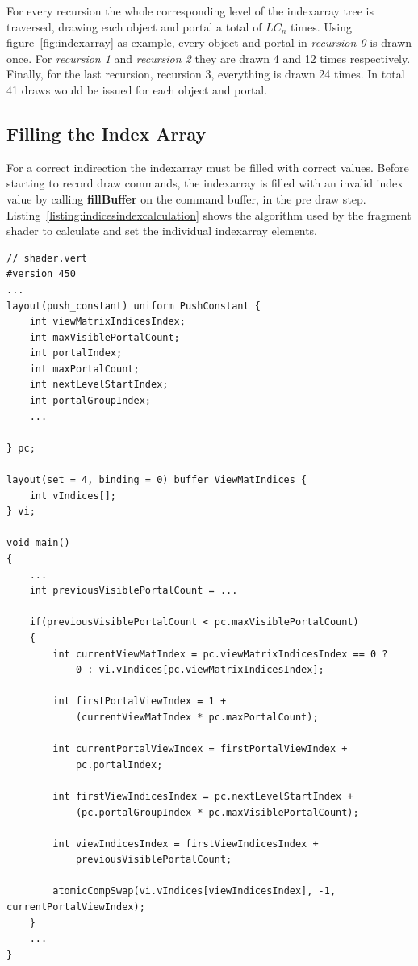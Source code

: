For every recursion the whole corresponding level of the \gls{indexarray} tree is traversed, drawing each object and portal a total of $LC_n$ times. Using figure~\ref{fig:indexarray} as example, every object and portal in \textit{recursion 0} is drawn once. For \textit{recursion 1} and \textit{recursion 2} they are drawn 4 and 12 times respectively. Finally, for the last recursion, recursion 3, everything is drawn 24 times. In total 41 draws would be issued for each object and portal.

\subsection{Filling the Index Array}
For a correct indirection the \gls{indexarray} must be filled with correct values. Before starting to record draw commands, the \gls{indexarray} is filled with an invalid index value by calling \textbf{fillBuffer} on the command buffer, in the pre draw step. Listing~\ref{listing:indicesindexcalculation} shows the algorithm used by the fragment shader to calculate and set the individual \gls{indexarray} elements.

\begin{lstlisting}[caption={Calculating Indices Index}, label=listing:indicesindexcalculation]
// shader.vert
#version 450
...
layout(push_constant) uniform PushConstant {	
	int viewMatrixIndicesIndex;
	int maxVisiblePortalCount;
	int portalIndex;
	int maxPortalCount;
	int nextLevelStartIndex;
	int portalGroupIndex;
	...

} pc;

layout(set = 4, binding = 0) buffer ViewMatIndices {
	int vIndices[];
} vi;

void main()
{
	...
	int previousVisiblePortalCount = ...
	
	if(previousVisiblePortalCount < pc.maxVisiblePortalCount)
	{
		int currentViewMatIndex = pc.viewMatrixIndicesIndex == 0 ? 
			0 : vi.vIndices[pc.viewMatrixIndicesIndex];
		
		int firstPortalViewIndex = 1 +
			(currentViewMatIndex * pc.maxPortalCount);
		
		int currentPortalViewIndex = firstPortalViewIndex +
			pc.portalIndex;
		
		int firstViewIndicesIndex = pc.nextLevelStartIndex +
			(pc.portalGroupIndex * pc.maxVisiblePortalCount);
			
		int viewIndicesIndex = firstViewIndicesIndex +
			previousVisiblePortalCount;
			
		atomicCompSwap(vi.vIndices[viewIndicesIndex], -1, currentPortalViewIndex);
	}
	...	
}

\end{lstlisting}

